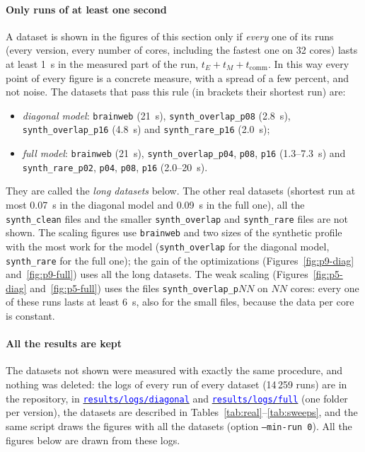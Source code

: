 \documentclass[conference,onecolumn]{IEEEtran}
\newcommand{\repolink}[1]{\href{https://github.com/HPC-2627/ParallelExpectationMaximizationClustering/tree/main/#1}{\textcolor{blue}{\nolinkurl{#1}}}}
\begin{document}
\paragraph{Only runs of at least one second} A dataset is shown in the figures of this section only if \emph{every} one of its runs (every version, every number of cores, including the fastest one on 32 cores) lasts at least 1~s in the measured part of the run, $t_E+t_M+t_{\mathrm{comm}}$. In this way every point of every figure is a concrete measure, with a spread of a few percent, and not noise. The datasets that pass this rule (in brackets their shortest run) are:
\begin{itemize}
\item \emph{diagonal model}: \texttt{brainweb} (21~s), \texttt{synth\_overlap\_p08} (2.8~s), \texttt{synth\_overlap\_p16} (4.8~s) and \texttt{synth\_rare\_p16} (2.0~s);
\item \emph{full model}: \texttt{brainweb} (21~s), \texttt{synth\_overlap\_p04}, \texttt{p08}, \texttt{p16} (1.3--7.3~s) and \texttt{synth\_rare\_p02}, \texttt{p04}, \texttt{p08}, \texttt{p16} (2.0--20~s).
\end{itemize}
They are called the \emph{long datasets} below. The other real datasets (shortest run at most 0.07~s in the diagonal model and 0.09~s in the full one), all the \texttt{synth\_clean} files and the smaller \texttt{synth\_overlap} and \texttt{synth\_rare} files are not shown. The scaling figures use \texttt{brainweb} and two sizes of the synthetic profile with the most work for the model (\texttt{synth\_overlap} for the diagonal model, \texttt{synth\_rare} for the full one); the gain of the optimizations (Figures~\ref{fig:p9-diag} and~\ref{fig:p9-full}) uses all the long datasets. The weak scaling (Figures~\ref{fig:p5-diag} and~\ref{fig:p5-full}) uses the files \texttt{synth\_overlap\_p}$NN$ on $NN$ cores: every one of these runs lasts at least 6~s, also for the small files, because the data per core is constant.


\paragraph{All the results are kept} The datasets not shown were measured with exactly the same procedure, and nothing was deleted: the logs of every run of every dataset (14\,259 runs) are in the repository, in \repolink{results/logs/diagonal} and \repolink{results/logs/full} (one folder per version), the datasets are described in Tables~\ref{tab:real}--\ref{tab:sweeps}, and the same script draws the figures with all the datasets (option \texttt{--min-run 0}). All the figures below are drawn from these logs.
\end{document}
